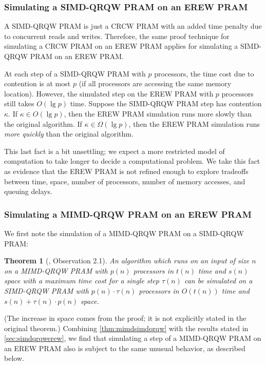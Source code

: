 \documentclass{article}
\newtheorem{theorem}{Theorem}
\begin{document}
\subsubsection{Simulating a SIMD-QRQW PRAM on an EREW PRAM}\label{sec:simdqrqwerew}

A SIMD-QRQW PRAM is just a CRCW PRAM with an added time penalty due to concurrent reads and writes.
Therefore, the same proof technique for simulating a CRCW PRAM on an EREW PRAM applies for simulating a SIMD-QRQW PRAM on an EREW PRAM.

At each step of a SIMD-QRQW PRAM with $p$ processors, the time cost due to contention is at most $p$ (if all processors are accessing the same memory location).
However, the simulated step on the EREW PRAM with $p$ processors still takes $O(\lg p)$ time.
Suppose the SIMD-QRQW PRAM step has contention $\kappa$.
If $\kappa\in O(\lg p)$, then the EREW PRAM simulation runs more slowly than the original algorithm.
If $\kappa\in\Omega(\lg p)$, then the EREW PRAM simulation runs \emph{more quickly} than the original algorithm.

This last fact is a bit unsettling; we expect a more restricted model of computation to take longer to decide a computational problem.
We take this fact as evidence that the EREW PRAM is not refined enough to explore tradeoffs between time, space, number of processors, number of memory accesses, and queuing delays.

\subsubsection{Simulating a MIMD-QRQW PRAM on an EREW PRAM}

We first note the simulation of a MIMD-QRQW PRAM on a SIMD-QRQW PRAM:

\begin{theorem}[\cite{gmr98a}, Observation 2.1]\label{thm:mimdsimdqrqw}
  An algorithm which runs on an input of size $n$ on a MIMD-QRQW PRAM with $p(n)$ processors in $t(n)$ time and $s(n)$ space with a maximum time cost for a single step $\tau(n)$ can be simulated on a SIMD-QRQW PRAM with $p(n)\cdot \tau(n)$ processors in $O(t(n))$ time and $s(n) + \tau(n) \cdot p(n)$ space.
\end{theorem}

(The increase in space comes from the proof; it is not explicitly stated in the original theorem.)
Combining \autoref{thm:mimdsimdqrqw} with the results stated in \autoref{sec:simdqrqwerew}, we find that simulating a step of a MIMD-QRQW PRAM on an EREW PRAM also is subject to the same unusual behavior, as described below.
\end{document}
